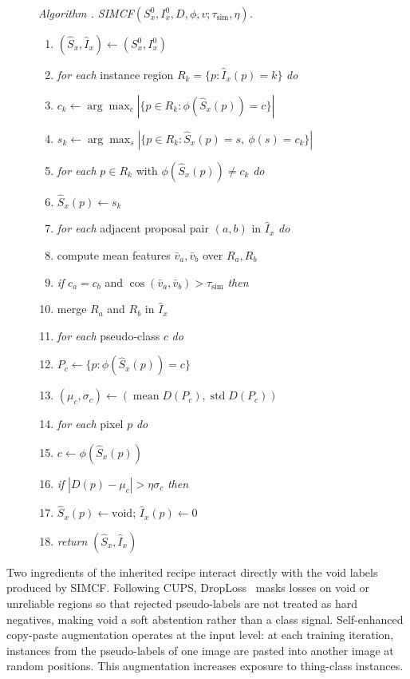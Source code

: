 \documentclass[10pt,twocolumn,letterpaper]{article}
\newcounter{algorithm}
\newenvironment{cvpralgorithm}{\begin{figure}[t]\refstepcounter{algorithm}\noindent\begin{minipage}{\linewidth}}{\end{minipage}\end{figure}}
\newcommand{\algorithmcaption}[1]{\noindent\emph{Algorithm \thealgorithm. #1}\par\vspace{2pt}}
\newcommand{\algkw}[1]{\emph{#1}}
\newcommand{\algindent}{\hspace*{1.2em}}
\newcommand{\algindenttwo}{\hspace*{2.4em}}
\begin{document}
\begin{cvpralgorithm}
\algorithmcaption{SIMCF$(S_x^0,I_x^0,D,\phi,v;\tau_\text{sim},\eta)$.}
\label{alg:simcf}
\begin{enumerate}
\setlength{\itemsep}{0pt}
\setlength{\topsep}{2pt}
\item $(\hat S_x,\hat I_x) \gets (S_x^0,I_x^0)$
\item \algkw{for each} instance region $R_k=\{p:\hat I_x(p)=k\}$ \algkw{do}
\item \algindent $c_k \gets \arg\max_c |\{p\in R_k:\phi(\hat S_x(p))=c\}|$
\item \algindent $s_k \gets \arg\max_s |\{p\in R_k:\hat S_x(p)=s,\ \phi(s)=c_k\}|$
\item \algindent \algkw{for each} $p\in R_k$ with $\phi(\hat S_x(p))\ne c_k$ \algkw{do}
\item \algindenttwo $\hat S_x(p)\gets s_k$
\item \algkw{for each} adjacent proposal pair $(a,b)$ in $\hat I_x$ \algkw{do}
\item \algindent compute mean features $\bar v_a,\bar v_b$ over $R_a,R_b$
\item \algindent \algkw{if} $c_a=c_b$ and $\cos(\bar v_a,\bar v_b)>\tau_\text{sim}$ \algkw{then}
\item \algindenttwo merge $R_a$ and $R_b$ in $\hat I_x$
\item \algkw{for each} pseudo-class $c$ \algkw{do}
\item \algindent $P_c\gets\{p:\phi(\hat S_x(p))=c\}$
\item \algindent $(\mu_c,\sigma_c)\gets(\operatorname{mean}D(P_c),\operatorname{std}D(P_c))$
\item \algkw{for each} pixel $p$ \algkw{do}
\item \algindent $c\gets\phi(\hat S_x(p))$
\item \algindent \algkw{if} $|D(p)-\mu_c|>\eta\sigma_c$ \algkw{then}
\item \algindenttwo $\hat S_x(p)\gets\mathrm{void}$; \quad $\hat I_x(p)\gets0$
\item \algkw{return} $(\hat S_x,\hat I_x)$
\end{enumerate}
\end{cvpralgorithm}

Two ingredients of the inherited recipe interact directly with the void labels produced by SIMCF. Following CUPS, DropLoss~\cite{wang2023cutler} masks losses on void or unreliable regions so that rejected pseudo-labels are not treated as hard negatives, making void a soft abstention rather than a class signal. Self-enhanced copy-paste augmentation operates at the input level: at each training iteration, instances from the pseudo-labels of one image are pasted into another image at random positions. This augmentation increases exposure to thing-class instances.
\end{document}
